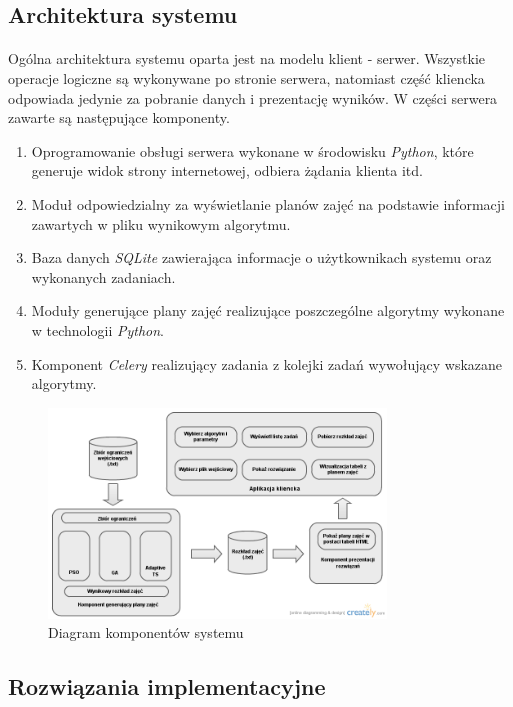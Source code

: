 \subsection{Architektura systemu}
\paragraph{} Ogólna architektura systemu oparta jest na modelu klient - serwer. Wszystkie operacje logiczne są wykonywane po stronie serwera, natomiast część kliencka odpowiada jedynie za pobranie danych i prezentację wyników. W części serwera zawarte są następujące komponenty.
\begin{enumerate}
\item Oprogramowanie obsługi serwera wykonane w środowisku \emph{Python}, które generuje widok strony internetowej, odbiera żądania klienta itd.
\item Moduł odpowiedzialny za wyświetlanie planów zajęć na podstawie informacji zawartych w pliku wynikowym algorytmu.
\item Baza danych \emph{SQLite} zawierająca informacje o użytkownikach systemu oraz wykonanych zadaniach.
\item Moduły generujące plany zajęć realizujące poszczególne algorytmy wykonane w technologii \emph{Python}.
\item Komponent \emph{Celery} realizujący zadania z kolejki zadań wywołujący wskazane algorytmy.
\end{enumerate}
\begin{figure}[H]
  \caption{Diagram komponentów systemu}
  \centering
    \includegraphics[width=0.8\textwidth]{img/ComponentsDiagram.png}
\end{figure}
\subsection{Rozwiązania implementacyjne}
